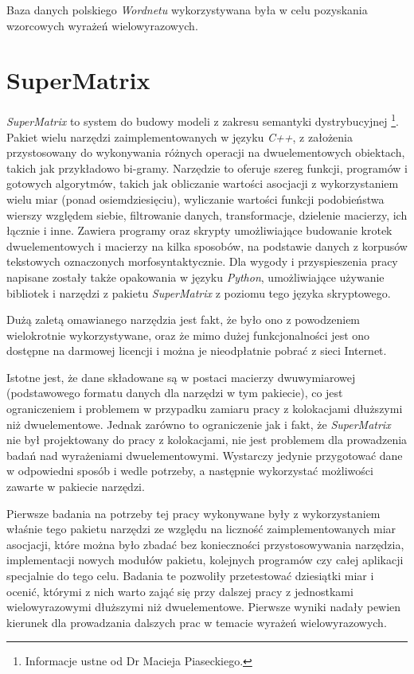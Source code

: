 \par
Baza danych polskiego \emph{Wordnetu} wykorzystywana była w celu pozyskania wzorcowych wyrażeń wielowyrazowych.

\section{SuperMatrix}
\emph{SuperMatrix} \cite{supermatrix} to system do budowy modeli z zakresu semantyki dystrybucyjnej \footnote{Informacje ustne od Dr Macieja Piaseckiego.}. 
Pakiet wielu narzędzi zaimplementowanych w języku \emph{C++}, z założenia przystosowany do wykonywania różnych operacji na dwuelementowych obiektach, takich jak przykładowo bi-gramy. 
Narzędzie to oferuje szereg funkcji, programów i gotowych algorytmów, takich jak obliczanie wartości asocjacji z wykorzystaniem wielu miar (ponad osiemdziesięciu), wyliczanie wartości funkcji podobieństwa wierszy względem siebie, filtrowanie danych, transformacje, dzielenie macierzy, ich łącznie i inne.
Zawiera programy oraz skrypty umożliwiające budowanie krotek dwuelementowych i macierzy na kilka sposobów, na podstawie danych z korpusów tekstowych oznaczonych morfosyntaktycznie.
Dla wygody i przyspieszenia pracy napisane zostały także opakowania w języku \emph{Python}, umożliwiające używanie bibliotek i narzędzi z pakietu \emph{SuperMatrix} z poziomu tego języka skryptowego.

\par
Dużą zaletą omawianego narzędzia jest fakt, że było ono z powodzeniem wielokrotnie wykorzystywane, oraz że mimo dużej funkcjonalności jest ono dostępne na darmowej licencji i można je nieodpłatnie pobrać z sieci Internet.

\par
Istotne jest, że dane składowane są w postaci macierzy dwuwymiarowej (podstawowego formatu danych dla narzędzi w tym pakiecie), co jest ograniczeniem i problemem w przypadku zamiaru pracy z kolokacjami dłuższymi niż dwuelementowe. 
Jednak zarówno to ograniczenie jak i fakt, że \emph{SuperMatrix} nie był projektowany do pracy z kolokacjami, nie jest problemem dla prowadzenia badań nad wyrażeniami dwuelementowymi. 
Wystarczy jedynie przygotować dane w odpowiedni sposób i wedle potrzeby, a następnie wykorzystać możliwości zawarte w pakiecie narzędzi.

\par
Pierwsze badania na potrzeby tej pracy wykonywane były z wykorzystaniem właśnie tego pakietu narzędzi ze względu na liczność zaimplementowanych miar asocjacji, które można było zbadać bez konieczności przystosowywania narzędzia, implementacji nowych modułów pakietu, kolejnych programów czy całej aplikacji specjalnie do tego celu.
Badania te pozwoliły przetestować dziesiątki miar i ocenić, którymi z nich warto zająć się przy dalszej pracy z jednostkami wielowyrazowymi dłuższymi niż dwuelementowe.
Pierwsze wyniki nadały pewien kierunek dla prowadzania dalszych prac w temacie wyrażeń wielowyrazowych.

